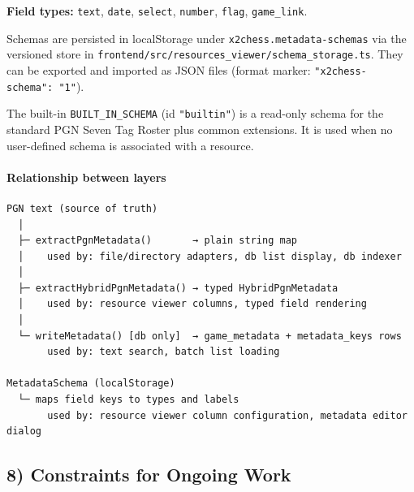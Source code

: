 \documentclass[]{article}
\let\oldparagraph\paragraph
\renewcommand{\paragraph}[1]{\oldparagraph{#1}\mbox{}}
\begin{document}
\textbf{Field types:} \texttt{text}, \texttt{date}, \texttt{select},
\texttt{number}, \texttt{flag}, \texttt{game\_link}.

Schemas are persisted in localStorage under
\texttt{x2chess.metadata-schemas} via the versioned store in
\texttt{frontend/src/resources\_viewer/schema\_storage.ts}. They can be
exported and imported as JSON files (format marker:
\texttt{"x2chess-schema":\ "1"}).

The built-in \texttt{BUILT\_IN\_SCHEMA} (id \texttt{"builtin"}) is a
read-only schema for the standard PGN Seven Tag Roster plus common
extensions. It is used when no user-defined schema is associated with a
resource.

\paragraph{Relationship between
layers}\label{relationship-between-layers}

\begin{verbatim}
PGN text (source of truth)
  │
  ├─ extractPgnMetadata()       → plain string map
  │    used by: file/directory adapters, db list display, db indexer
  │
  ├─ extractHybridPgnMetadata() → typed HybridPgnMetadata
  │    used by: resource viewer columns, typed field rendering
  │
  └─ writeMetadata() [db only]  → game_metadata + metadata_keys rows
       used by: text search, batch list loading

MetadataSchema (localStorage)
  └─ maps field keys to types and labels
       used by: resource viewer column configuration, metadata editor dialog
\end{verbatim}

\subsection{8) Constraints for Ongoing
Work}\label{constraints-for-ongoing-work}
\end{document}
